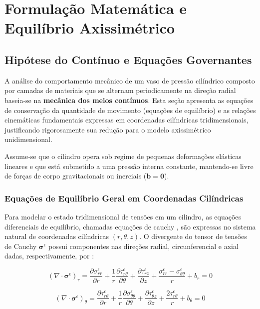\chapter{Formulação Matemática e Equilíbrio Axissimétrico}

\section{Hipótese do Contínuo e Equações Governantes}

A análise do comportamento mecânico de um vaso de pressão cilíndrico composto por camadas de materiais que se alternam periodicamente na direção radial baseia-se na \textbf{mecânica dos meios contínuos}. Esta seção apresenta as equações de conservação da quantidade de movimento (equações de equilíbrio) e as relações cinemáticas fundamentais expressas em coordenadas cilíndricas tridimensionais, justificando rigorosamente sua redução para o modelo axissimétrico unidimensional.

Assume-se que o cilindro opera sob regime de pequenas deformações elásticas lineares e que está submetido a uma pressão interna constante, mantendo-se livre de forças de corpo gravitacionais ou inerciais ($\mathbf{b} = \mathbf{0}$).

\subsection{Equações de Equilíbrio Geral em Coordenadas Cilíndricas}

Para modelar o estado tridimensional de tensões em um cilindro, as equações diferenciais de equilíbrio, chamadas equações de cauchy \cite{LaiBook},  são expressas no sistema natural de coordenadas cilíndricas $(r, \theta, z)$. O divergente do tensor de tensões de Cauchy $\boldsymbol{\sigma}^\epsilon$ possui componentes nas direções radial, circunferencial e axial dadas, respectivamente, por \cite{Sadd2009}:

\begin{equation}
 (\nabla \cdot \boldsymbol{\sigma}^\epsilon)_r = \frac{\partial \sigma_{rr}^\epsilon}{\partial r} + \frac{1}{r} \frac{\partial \tau_{r\theta}^\epsilon}{\partial \theta} + \frac{\partial \tau_{rz}^\epsilon}{\partial z} + \frac{\sigma_{rr}^\epsilon - \sigma_{\theta\theta}^\epsilon}{r} + b_r = 0
  \label{eq:equilibrium_3d_r}
\end{equation}

\begin{equation}
  (\nabla \cdot \boldsymbol{\sigma}^\epsilon)_\theta = \frac{\partial \tau_{r\theta}^\epsilon}{\partial r} + \frac{1}{r} \frac{\partial \sigma_{\theta\theta}^\epsilon}{\partial \theta} + \frac{\partial \tau_{\theta z}^\epsilon}{\partial z} + \frac{2 \tau_{r\theta}^\epsilon}{r} + b_\theta = 0
  \label{eq:equilibrium_3d_theta}
\end{equation}

